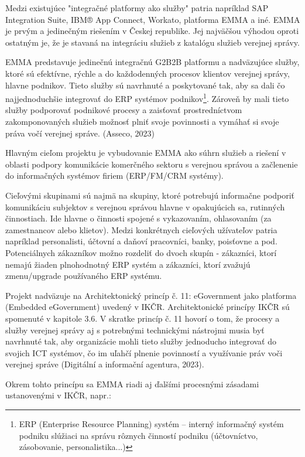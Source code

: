 Medzi existujúce "integračné platformy ako služby" patria napríklad SAP Integration Suite, IBM® App Connect, Workato, platforma EMMA a iné. EMMA je prvým a jedinečným riešením v Českej republike. Jej najväčšou výhodou oproti ostatným je, že je stavaná na integráciu služieb z katalógu služieb verejnej správy.

EMMA predstavuje jedinečnú integračnú G2B2B platformu a nadväzujúce služby, ktoré sú efektívne, rýchle a  do každodenných procesov klientov verejnej správy, hlavne podnikov. Tieto služby sú navrhnuté a poskytované tak, aby sa dali čo najjednoduchšie integrovať do ERP systémov podnikov\footnote{ERP (Enterprise Resource Planning) systém -- interný informačný systém podniku slúžiaci na správu rôznych činností podniku (účtovníctvo, zásobovanie, personalistika...)}. Zároveň by mali tieto služby podporovať podnikové procesy a zaisťovať prostredníctvom zakomponovaných služieb možnosť plniť svoje povinnosti a vymáhať si svoje práva vočí verejnej správe. \scr(Asseco, 2023)

Hlavným cieľom projektu je vybudovanie EMMA ako súhrn služieb a riešení v oblasti podpory komunikácie komerčného sektoru s verejnou správou a začlenenie do informačných systémov firiem (ERP/FM/CRM systémy).

Cieľovými skupinami sú najmä na skupiny, ktoré potrebujú informačne podporiť komunikáciu subjektov s verejnou správou hlavne v opakujúcich sa, rutinných činnostiach. Ide hlavne o činnosti spojené s vykazovaním, ohlasovaním (za zamestnancov alebo klietov). Medzi konkrétnych cieľových užívateľov patria napríklad personalisti, účtovní a daňoví pracovníci, banky, poisťovne a pod. Potenciálnych zákazníkov možno rozdeliť do dvoch skupín - zákazníci, ktorí nemajú žiaden plnohodnotný ERP systém a zákazníci, ktorí zvažujú zmenu/upgrade používaného ERP systému.

Projekt nadväzuje na Architektonický princíp č. 11: eGovernment jako platforma (Embedded eGovernment) uvedený v IKČR. Architektonické princípy IKČR sú spomenuté v kapitole 3.6. V skratke princíp č. 11 hovorí o tom, že procesy a služby verejnej správy aj s potrebnými technickými nástrojmi musia byť navrhnuté tak, aby organizácie mohli tieto služby jednoducho integrovať do svojich ICT systémov, čo im uľahčí plnenie povinností a využívanie práv voči verejnej správe \scr(Digitální a informační agentura, 2023).

Okrem tohto princípu sa EMMA riadi aj ďalšími procesnými zásadami ustanovenými v IKČR, napr.: 

